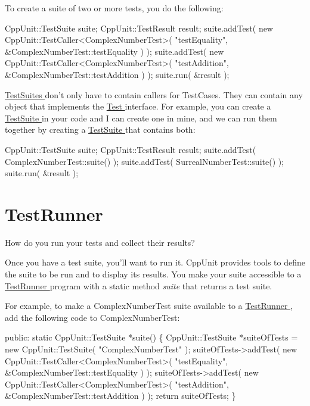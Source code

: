 To create a suite of two or more tests, you do the following\+:


\begin{DoxyCode}
CppUnit::TestSuite suite;
CppUnit::TestResult result;
suite.addTest( \textcolor{keyword}{new} CppUnit::TestCaller<ComplexNumberTest>(
                       \textcolor{stringliteral}{"testEquality"}, 
                       &ComplexNumberTest::testEquality ) );
suite.addTest( \textcolor{keyword}{new} CppUnit::TestCaller<ComplexNumberTest>(
                       \textcolor{stringliteral}{"testAddition"}, 
                       &ComplexNumberTest::testAddition ) );
suite.run( &result );
\end{DoxyCode}


\hyperlink{}{Test\+Suites } don't only have to contain callers for Test\+Cases. They can contain any object that implements the \hyperlink{}{Test } interface. For example, you can create a \hyperlink{}{Test\+Suite } in your code and I can create one in mine, and we can run them together by creating a \hyperlink{}{Test\+Suite } that contains both\+:


\begin{DoxyCode}
CppUnit::TestSuite suite;
CppUnit::TestResult result;
suite.addTest( ComplexNumberTest::suite() );
suite.addTest( SurrealNumberTest::suite() );
suite.run( &result );
\end{DoxyCode}
\hypertarget{cppunit_cookbook_test_runner}{}\section{Test\+Runner}\label{cppunit_cookbook_test_runner}
How do you run your tests and collect their results?

Once you have a test suite, you'll want to run it. Cpp\+Unit provides tools to define the suite to be run and to display its results. You make your suite accessible to a \hyperlink{group___executing_test}{Test\+Runner } program with a static method {\itshape suite} that returns a test suite.

For example, to make a Complex\+Number\+Test suite available to a \hyperlink{group___executing_test}{Test\+Runner }, add the following code to Complex\+Number\+Test\+:


\begin{DoxyCode}
\textcolor{keyword}{public}: 
  \textcolor{keyword}{static} CppUnit::TestSuite *suite()
  \{
    CppUnit::TestSuite *suiteOfTests = \textcolor{keyword}{new} CppUnit::TestSuite( \textcolor{stringliteral}{"ComplexNumberTest"} );
    suiteOfTests->addTest( \textcolor{keyword}{new} CppUnit::TestCaller<ComplexNumberTest>( 
                                   \textcolor{stringliteral}{"testEquality"}, 
                                   &ComplexNumberTest::testEquality ) );
    suiteOfTests->addTest( \textcolor{keyword}{new} CppUnit::TestCaller<ComplexNumberTest>(
                                   \textcolor{stringliteral}{"testAddition"},
                                   &ComplexNumberTest::testAddition ) );
    \textcolor{keywordflow}{return} suiteOfTests;
  \}
\end{DoxyCode}


